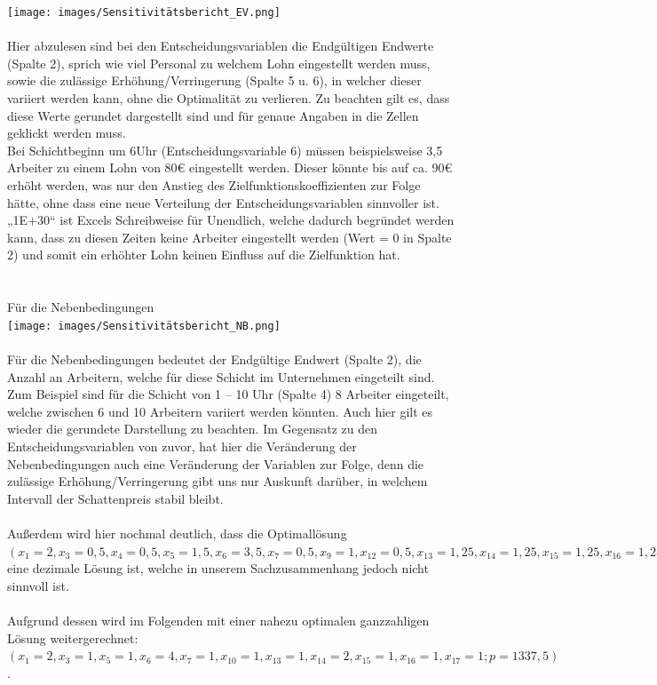 \texttt{[image: images/Sensitivitätsbericht\_EV.png]}\\\\
Hier abzulesen sind bei den Entscheidungsvariablen die Endgültigen Endwerte (Spalte 2), sprich wie viel Personal zu welchem Lohn eingestellt werden muss, sowie die zulässige Erhöhung/Verringerung (Spalte 5 u. 6), in welcher dieser variiert werden kann, ohne die Optimalität zu verlieren. Zu beachten gilt es, dass diese Werte gerundet dargestellt sind und für genaue Angaben in die Zellen geklickt werden muss.\\
Bei Schichtbeginn um 6Uhr (Entscheidungsvariable 6) müssen beispielsweise 3,5 Arbeiter zu einem Lohn von 80€ eingestellt werden. Dieser könnte bis auf ca. 90€ erhöht werden, was nur den Anstieg des Zielfunktionskoeffizienten zur Folge hätte, ohne dass eine neue Verteilung der Entscheidungsvariablen sinnvoller ist. „1E+30“ ist Excels Schreibweise für Unendlich, welche dadurch begründet werden kann, dass zu diesen Zeiten keine Arbeiter eingestellt werden (Wert = 0 in Spalte 2) und somit ein erhöhter Lohn keinen Einfluss auf die Zielfunktion hat.\\
\\\\
Für die Nebenbedingungen\\
\texttt{[image: images/Sensitivitätsbericht\_NB.png]}\\\\
Für die Nebenbedingungen bedeutet der Endgültige Endwert (Spalte 2), die Anzahl an Arbeitern, welche für diese Schicht im Unternehmen eingeteilt sind. Zum Beispiel sind für die Schicht von 1 – 10 Uhr (Spalte 4) 8 Arbeiter eingeteilt, welche zwischen 6 und 10 Arbeitern variiert werden könnten. Auch hier gilt es wieder die gerundete Darstellung zu beachten. Im Gegensatz zu den Entscheidungsvariablen von zuvor, hat hier die Veränderung der Nebenbedingungen auch eine Veränderung der Variablen zur Folge, denn die zulässige Erhöhung/Verringerung gibt uns nur Auskunft darüber, in welchem Intervall der Schattenpreis stabil bleibt.\\
\\
Außerdem wird hier nochmal deutlich, dass die Optimallösung $(x_1=2, x_3=0,5, x_4=0,5, x_5=1,5, x_6=3,5, x_7=0,5, x_9=1, x_{12}=0,5, x_{13}=1,25, x_{14}=1,25, x_{15}=1,25, x_{16}=1,25, x_{17}=0,75; p=1316,25)$ eine dezimale Lösung ist, welche in unserem Sachzusammenhang jedoch nicht sinnvoll ist.\\
\\
Aufgrund dessen wird im Folgenden mit einer nahezu optimalen ganzzahligen Lösung weitergerechnet: $(x_1=2, x_3=1, x_5=1, x_6=4, x_7=1, x_{10}=1, x_{13}=1, x_{14}=2, x_{15}=1, x_{16}=1, x_{17}=1; p=1337,5)$.\\ 

